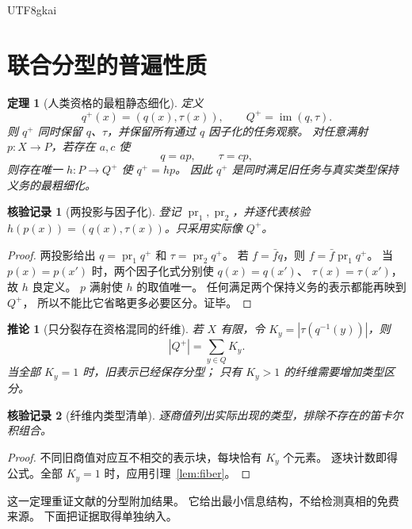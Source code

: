 \documentclass[12pt,a4paper,openany]{report}
\newtheorem{theorem}{定理}[chapter]
\newtheorem{corollary}{推论}[chapter]
\newtheorem{Certificate}{核验记录}[chapter]
\newcommand{\im}{\operatorname{im}}
\begin{document}
\begin{CJK*}{UTF8}{gkai}
\section{联合分型的普遍性质}
\begin{theorem}[人类资格的最粗静态细化]
\label{thm:minimal-refinement}
定义
\[
q^+(x)=(q(x),\tau(x)),\qquad Q^+=\im(q,\tau).
\]
则 \(q^+\) 同时保留 \(q\)、\(\tau\)，并保留所有通过 \(q\) 因子化的任务观察。
对任意满射 \(p:X\to P\)，若存在 \(a,c\) 使
\[
q=ap,\qquad \tau=cp,
\]
则存在唯一 \(h:P\to Q^+\) 使 \(q^+=hp\)。
因此 \(q^+\) 是同时满足旧任务与真实类型保持义务的最粗细化。
\end{theorem}
\begin{Certificate}[两投影与因子化]
登记 \(\operatorname{pr}_1,\operatorname{pr}_2\)，并逐代表核验
\(h(p(x))=(q(x),\tau(x))\)。只采用实际像 \(Q^+\)。
\end{Certificate}
\begin{proof}
两投影给出 \(q=\operatorname{pr}_1q^+\) 和
\(\tau=\operatorname{pr}_2q^+\)。
若 \(f=\bar f q\)，则 \(f=\bar f\operatorname{pr}_1q^+\)。
当 \(p(x)=p(x')\) 时，两个因子化式分别使 \(q(x)=q(x')\)、
\(\tau(x)=\tau(x')\)，故 \(h\) 良定义。
\(p\) 满射使 \(h\) 的取值唯一。
任何满足两个保持义务的表示都能再映到 \(Q^+\)，
所以不能比它省略更多必要区分。证毕。
\end{proof}

\begin{corollary}[只分裂存在资格混同的纤维]
\label{cor:fiber-count}
若 \(X\) 有限，令 \(K_y=|\tau(q^{-1}(y))|\)，则
\[
|Q^+|=\sum_{y\in Q}K_y.
\]
当全部 \(K_y=1\) 时，旧表示已经保存分型；
只有 \(K_y>1\) 的纤维需要增加类型区分。
\end{corollary}
\begin{Certificate}[纤维内类型清单]
逐商值列出实际出现的类型，排除不存在的笛卡尔积组合。
\end{Certificate}
\begin{proof}
不同旧商值对应互不相交的表示块，每块恰有 \(K_y\) 个元素。
逐块计数即得公式。全部 \(K_y=1\) 时，应用引理~\ref{lem:fiber}。
\end{proof}

这一定理重证文献\cite{GRate}的分型附加结果。
它给出最小信息结构，不给检测真相的免费来源。
下面把证据取得单独纳入。


\end{CJK*}
\end{document}
